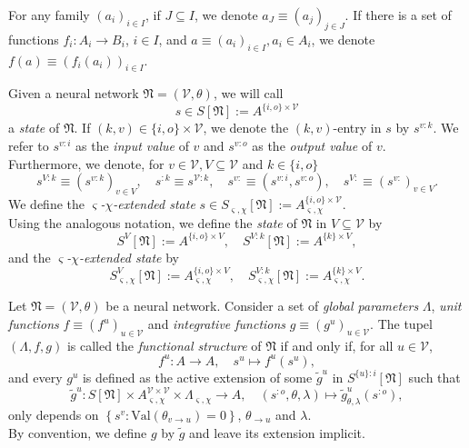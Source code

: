 \documentclass[a4paper,11pt]{report}
\newcommand{\const}{\varsigma} %
\newcommand{\var}{\chi} %
\newcommand{\Val}{\text{Val}}
\begin{document}
\begin{Not}
For any family $(a_i)_{i\in I}$, if $J\subseteq I$, we denote $a_J\equiv(a_j)_{j\in J}$. If there is a set of functions $f_i:A_i\to B_i$, $i\in I$, and $a\equiv(a_i)_{i\in I},a_i\in A_i$, we denote $f(a)\equiv\left(f_i(a_i)\right)_{i\in I}$.
\end{Not}

\begin{Def}[States]
Given a neural network $\mathfrak{N}=(\mathcal{V},\theta)$, we will call
\[
s\in S[\mathfrak{N}]:=A^{\{i,o\}\times\mathcal{V}}
\]
a \emph{state} of $\mathfrak{N}$. If $(k,v)\in\{i,o\}\times\mathcal{V}$, we denote the $(k,v)$-entry in $s$ by $s^{v:k}$. We refer to $s^{v:i}$ as the \emph{input value} of $v$ and $s^{v:o}$ as the \emph{output value} of $v$.\\
Furthermore, we denote, for $v\in\mathcal{V},V\subseteq\mathcal{V}$ and $k\in\{i,o\}$
\[
s^{V:k}\equiv\left(s^{v:k}\right)_{v\in V},
\quad
s^{:k}\equiv s^{\mathcal{V}:k},
\quad
s^{v:}\equiv\left(s^{v:i},s^{v:o}\right),
\quad
s^{V:}\equiv\left(s^{v:}\right)_{v\in V}.
\]
We define the \emph{$\const$-$\var$-extended state} $s\in S_{\const,\var}[\mathfrak{N}]:=A_{\const,\var}^{\{i,o\}\times\mathcal{V}}$.\\
Using the analogous notation, we define the \emph{state} of $\mathfrak{N}$ in $V\subseteq\mathcal{V}$ by 
\[
S^V[\mathfrak{N}]:=A^{\{i,o\}\times V},
\quad
S^{V:k}[\mathfrak{N}]:=A^{\{k\}\times V},
\]
and the \emph{$\const$-$\var$-extended state} by
\[
S^V_{\const,\var}[\mathfrak{N}]:=A^{\{i,o\}\times V}_{\const,\var},
\quad
S^{V:k}_{\const,\var}[\mathfrak{N}]:=A^{\{k\}\times V}_{\const,\var}.
\]
\end{Def}

\begin{Def}
Let $\mathfrak{N}=(\mathcal{V},\theta)$ be a neural network.
Consider a set of \emph{global parameters} $\Lambda$, \emph{unit functions} $f\equiv\left(f^u\right)_{u\in\mathcal{V}}$ and \emph{integrative functions} $g\equiv\left(g^u\right)_{u\in\mathcal{V}}$.
The tupel $(\Lambda,f,g)$ is called the \emph{functional structure} of $\mathfrak{N}$ if and only if, for all $u\in\mathcal{V}$,
\begin{equation}
f^u:A\to A,\quad s^u\mapsto f^u(s^u),
\end{equation}
and every $g^u$ is defined as the active extension of some $\tilde{g}^u$ in $S^{\{u\}:i}[\mathfrak{N}]$ such that
\begin{equation}
\tilde{g}^u:S[\mathfrak{N}]\times A_{\const,\var}^{\mathcal{V}\times\mathcal{V}}\times\Lambda_{\const,\var}\to A,
\quad
(s^{:o},\theta,\lambda)\mapsto \tilde{g}^u_{\theta,\lambda}(s^{:o}),
\end{equation}
only depends on $\left\{s^v:\Val(\theta_{v\to u})=0\right\}$, $\theta_{\to u}$ and $\lambda$.\\
By convention, we define $g$ by $\tilde{g}$ and leave its extension implicit.
\end{Def}
\end{document}
